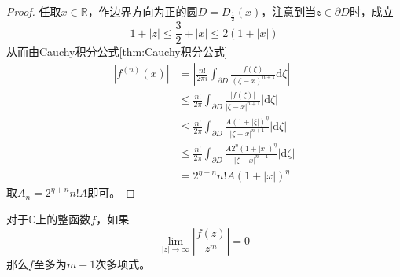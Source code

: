 \documentclass[lang = cn, scheme = chinese, thmcnt = section]{elegantbook}
\newcommand{\R}{\mathbb{R}}            %
\newcommand{\C}{\mathbb{C}}  		   %
\begin{document}
\begin{proof}
	任取$x\in\R$，作边界方向为正的圆$D=D_{\frac{1}{2}}(x)$，注意到当$z\in\partial D$​时，成立
	$$
	1+|z|\le\frac{3}{2}+|x|\le2(1+|x|)
	$$
	从而由Cauchy积分公式\ref{thm:Cauchy积分公式}
	\begin{align*}
		|f^{(n)}(x)|&=\left| \frac{n!}{2\pi i}\int_{\partial D}{\frac{f(\zeta)}{(\zeta-x)^{n+1}}\mathrm{d}\zeta} \right|\\
		&\le\frac{n!}{2\pi}\int_{\partial D}{\frac{|f(\zeta)|}{|\zeta-x|^{n+1}}|\mathrm{d}\zeta}|\\
		&\le\frac{n!}{2\pi}\int_{\partial D}{\frac{A(1+|\xi|)^\eta}{|\zeta-x|^{n+1}}|\mathrm{d}\zeta}|\\
		&\le\frac{n!}{2\pi}\int_{\partial D}{\frac{A2^\eta(1+|x|)^\eta}{|\zeta-x|^{n+1}}|\mathrm{d}\zeta}|\\
		&=2^{\eta+n}n!A(1+|x|)^{\eta}
	\end{align*}
	取$A_n=2^{\eta+n}n!A$即可。
\end{proof}

\begin{proposition}
	对于$\C$上的整函数$f$，如果
	$$
	\lim_{|z|\to\infty}\left| \frac{f(z)}{z^m} \right|=0
	$$
	那么$f$至多为$m-1$次多项式。
\end{proposition}
\end{document}
